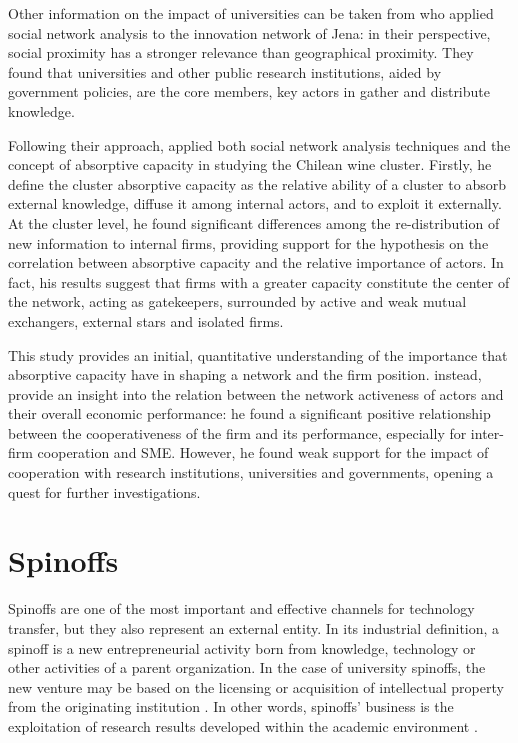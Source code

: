 Other information on the impact of universities can be taken from \citet{Cantner2006} who applied social network analysis to the innovation network of Jena: in their perspective, social proximity has a stronger relevance than geographical proximity. They found that universities and other public research institutions, aided by government policies, are the core members, key actors in gather and distribute knowledge.

Following their approach, \citet{Giuliani2005} applied both social network analysis techniques and the concept of absorptive capacity in studying the Chilean wine cluster. Firstly, he define the cluster absorptive capacity as the relative ability of a cluster to absorb external knowledge, diffuse it among internal actors, and to exploit it externally. At the cluster level, he found significant differences among the re-distribution of new information to internal firms, providing support for the hypothesis on the correlation between absorptive capacity and the relative importance of actors. In fact, his results suggest that firms with a greater capacity constitute the center of the network, acting as gatekeepers, surrounded by active and weak mutual exchangers, external stars and isolated firms.

This study provides an initial, quantitative understanding of the importance that absorptive capacity have in shaping a network and the firm position. \citet{Zeng2010} instead, provide an insight into the relation between the network activeness of actors and their overall economic performance: he found a significant positive relationship between the cooperativeness of the firm and its performance, especially for inter-firm cooperation and SME. However, he found weak support for the impact of cooperation with research institutions, universities and governments, opening a quest for further investigations.


\section{Spinoffs}

Spinoffs are one of the most important and effective channels for technology transfer, but they also represent an external entity. In its industrial definition, a spinoff is a new entrepreneurial activity born from knowledge, technology or other activities of a parent organization. In the case of university spinoffs, the new venture may be based on the licensing or acquisition of intellectual property from the originating institution \citep{Lockett2005a}. In other words, spinoffs' business is the exploitation of research results developed within the academic environment \citep{Rizzo2015}.

